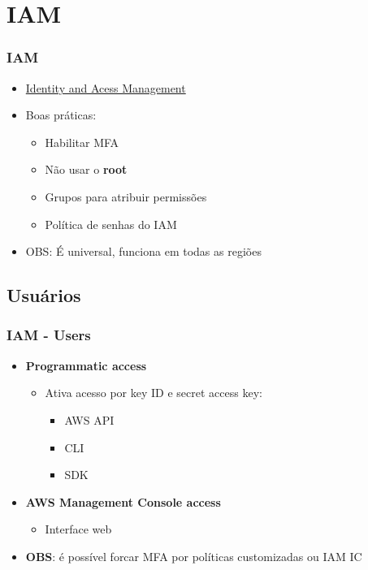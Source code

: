 \section{IAM}

\begin{frame}
	\frametitle{IAM}
	\begin{itemize}
		\item \href{https://docs.aws.amazon.com/wellarchitected/latest/security-pillar/identity-and-access-management.html}{Identity and Acess Management}
		\item Boas práticas:
			\begin{itemize}
				\item Habilitar MFA
				\item Não usar o \textbf{root}
				\item Grupos para atribuir permissões
				\item Política de senhas do IAM
			\end{itemize}
		\item OBS: É universal, funciona em todas as regiões
	\end{itemize}
\end{frame}

\subsection{Usuários}

\begin{frame}
	\frametitle{IAM - Users}
	\begin{itemize}
		\item \textbf{Programmatic access}
			\begin{itemize}
				\item Ativa acesso por key ID e secret access key:
					\begin{itemize}
						\item AWS API
						\item CLI
						\item SDK
					\end{itemize}
			\end{itemize}
		\item \textbf{AWS Management Console access}
			\begin{itemize}
				\item Interface web
			\end{itemize}
		\item \textbf{OBS}: é possível forcar MFA por políticas customizadas ou IAM IC
	\end{itemize}
\end{frame}

